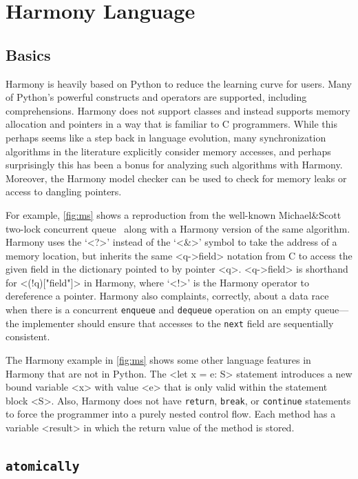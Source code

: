 \documentclass[twocolumn]{article}
\begin{document}
\section{Harmony Language}

\subsection{Basics}

Harmony is heavily based on Python to reduce the learning curve for
users.  Many of Python's powerful constructs and operators are
supported, including comprehensions.  Harmony does
not support classes and instead supports memory allocation and
pointers in a way that is familiar to C programmers.  While this
perhaps seems like a step back in language evolution, many
synchronization algorithms in the literature explicitly consider
memory accesses, and perhaps surprisingly this has been a bonus for
analyzing such algorithms with Harmony.  Moreover, the Harmony model
checker can be used to check for memory leaks or access to dangling
pointers.

For example, \autoref{fig:ms} shows a reproduction from the well-known
Michael\&Scott two-lock concurrent queue~\cite{MS96} along with a
Harmony version of the same algorithm.
Harmony uses the `<{?}>' instead of the `<{&}>' symbol to take the address
of a memory location, but inherits the same <{q->field}> notation
from C to access the given field in the dictionary pointed to by
pointer <{q}>.  <{q->field}> is shorthand for <{(!q)["field"]}> in
Harmony, where `<{!}>' is the Harmony operator to dereference a pointer.
Harmony also complaints, correctly, about a data race when
there is a concurrent \texttt{enqueue} and \texttt{dequeue} operation
on an empty queue---the implementer should ensure that accesses to the
\texttt{next} field are sequentially consistent.

The Harmony example in \autoref{fig:ms} shows some other language
features in Harmony that are not in Python.
The <{let x = e: S}> statement introduces a new bound variable <{x}>
with value <{e}> that is only valid within the statement block <{S}>.
Also, Harmony does not have \texttt{return}, \texttt{break}, or
\texttt{continue} statements to force the programmer into a purely
nested control flow.  Each method has a variable <{result}> in which
the return value of the method is stored.

\subsection{\texttt{atomically}}
\end{document}
